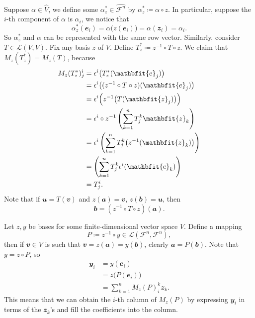 \documentclass[math, code]{amznotes}
\theoremstyle{remark}
\begin{document}
Suppose $\alpha \in \hat{V}$, we define some $\alpha^*_z \in \hat{\mathcal{F}^n}$ by $\alpha^*_z \coloneqq \alpha \circ z$. In particular, suppose the $i$-th component of $\alpha$ is $\alpha_i$, we notice that
\begin{equation*}
    \alpha^*_z(\mathbfit{e}_i) = \alpha\bigl(z(\mathbfit{e}_i)\bigr) = \alpha(\mathbfit{z}_i) = \alpha_i.
\end{equation*}
So $\alpha^*_z$ and $\alpha$ can be represented with the same row vector. Similarly, consider $T \in \mathcal{L}(V, V)$. Fix any basis $z$ of $V$. Define $T^*_z \coloneqq z^{-1} \circ T \circ z$. We claim that $M_z(T^*_z) = M_z(T)$, because
\begin{align*}
    M_z(T^*_z)^i_j & = \epsilon^i\bigl(T^*_z(\mathbfit{e}_j)\bigr) \\
    & = \epsilon^i\bigl((z^{-1} \circ T \circ z)(\mathbfit{e}_j)\bigr) \\
    & = \epsilon^i\Bigl(z^{-1}\bigl(T(\mathbfit{z}_j)\bigr)\Bigr) \\
    & = \epsilon^i \circ z^{-1}\left(\sum_{k = 1}^{n}T^k_j\mathbfit{z}_k\right) \\
    & = \epsilon^i\left(\sum_{k = 1}^{n}T^k_j\bigl(z^{-1}(\mathbfit{z}_k)\bigr)\right) \\
    & = \left(\sum_{k = 1}^{n}T^k_j\epsilon^i(\mathbfit{e}_k)\right) \\
    & = T^i_j.
\end{align*}
Note that if $\mathbfit{u} = T(\mathbfit{v})$ and $z(\mathbfit{a}) = \mathbfit{v}$, $z(\mathbfit{b}) = \mathbfit{u}$, then 
\begin{equation*}
    \mathbfit{b} = \left(z^{-1} \circ T \circ z\right)(\mathbfit{a}).
\end{equation*}

Let $z, y$ be bases for some finite-dimensional vector space $V$. Define a mapping
\begin{equation*}
    P \coloneqq z^{-1} \circ y \in \mathcal{L}\left(\mathcal{F}^n, \mathcal{F}^n\right),
\end{equation*}
then if $\mathbfit{v} \in V$ is such that $\mathbfit{v} = z(\mathbfit{a}) = y(\mathbfit{b})$, clearly $\mathbfit{a} = P(\mathbfit{b})$. Note that $y = z \circ P$, so
\begin{align*}
    \mathbfit{y}_i & = y(\mathbfit{e}_i) \\
    & = z\bigl(P(\mathbfit{e}_i)\bigr) \\
    & = \sum_{k = 1}^{n}M_z(P)^k_i\mathbfit{z}_k.
\end{align*} 
This means that we can obtain the $i$-th column of $M_z(P)$ by expressing $\mathbfit{y}_i$ in terms of the $\mathbfit{z}_k$'s and fill the coefficients into the column.
\end{document}

